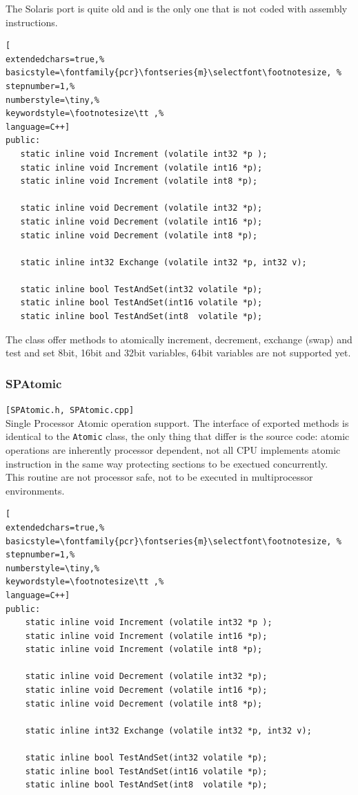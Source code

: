The Solaris port is quite old and is the only one that is not coded with assembly instructions.

\begin{lstlisting}[
extendedchars=true,%
basicstyle=\fontfamily{pcr}\fontseries{m}\selectfont\footnotesize, %
stepnumber=1,%
numberstyle=\tiny,%
keywordstyle=\footnotesize\tt ,%
language=C++]
public:
   static inline void Increment (volatile int32 *p );
   static inline void Increment (volatile int16 *p);
   static inline void Increment (volatile int8 *p);

   static inline void Decrement (volatile int32 *p);
   static inline void Decrement (volatile int16 *p);
   static inline void Decrement (volatile int8 *p);

   static inline int32 Exchange (volatile int32 *p, int32 v);

   static inline bool TestAndSet(int32 volatile *p);
   static inline bool TestAndSet(int16 volatile *p);
   static inline bool TestAndSet(int8  volatile *p);
\end{lstlisting}

The class offer methods to atomically increment, decrement, exchange (swap) and test and set 8bit, 16bit and 32bit variables, 64bit variables are not supported yet.



\subsubsection{SPAtomic}
\texttt{[SPAtomic.h, SPAtomic.cpp]}\\
Single Processor Atomic operation support. The interface of exported methods is identical to the \texttt{Atomic} class, the only thing that differ is the source code: atomic operations are inherently processor dependent, not all CPU implements atomic instruction in the same way protecting sections to be exectued concurrently.\\ 


This routine are not processor safe, not to be executed in multiprocessor environments. \\


\begin{lstlisting}[
extendedchars=true,%
basicstyle=\fontfamily{pcr}\fontseries{m}\selectfont\footnotesize, %
stepnumber=1,%
numberstyle=\tiny,%
keywordstyle=\footnotesize\tt ,%
language=C++]
public:
    static inline void Increment (volatile int32 *p );
    static inline void Increment (volatile int16 *p);
    static inline void Increment (volatile int8 *p);

    static inline void Decrement (volatile int32 *p);
    static inline void Decrement (volatile int16 *p);
    static inline void Decrement (volatile int8 *p);

    static inline int32 Exchange (volatile int32 *p, int32 v);

    static inline bool TestAndSet(int32 volatile *p);
    static inline bool TestAndSet(int16 volatile *p);
    static inline bool TestAndSet(int8  volatile *p);
\end{lstlisting}



